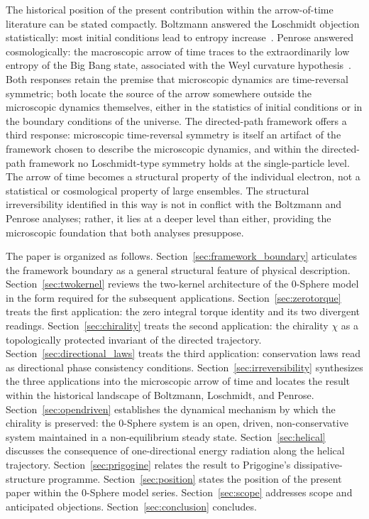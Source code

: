 \documentclass[%
 reprint, amsmath,amssymb, aps, prb, ]{revtex4-2}
\numberwithin{equation}{section}
\begin{document}
The historical position of the present contribution within the arrow-of-time literature can be stated compactly. Boltzmann answered the Loschmidt objection statistically: most initial conditions lead to entropy increase~\cite{Boltzmann1872}. Penrose answered cosmologically: the macroscopic arrow of time traces to the extraordinarily low entropy of the Big Bang state, associated with the Weyl curvature hypothesis~\cite{Penrose1989}. Both responses retain the premise that microscopic dynamics are time-reversal symmetric; both locate the source of the arrow somewhere outside the microscopic dynamics themselves, either in the statistics of initial conditions or in the boundary conditions of the universe. The directed-path framework offers a third response: microscopic time-reversal symmetry is itself an artifact of the framework chosen to describe the microscopic dynamics, and within the directed-path framework no Loschmidt-type symmetry holds at the single-particle level. The arrow of time becomes a structural property of the individual electron, not a statistical or cosmological property of large ensembles. The structural irreversibility identified in this way is not in conflict with the Boltzmann and Penrose analyses; rather, it lies at a deeper level than either, providing the microscopic foundation that both analyses presuppose.

The paper is organized as follows. Section~\ref{sec:framework_boundary} articulates the framework boundary as a general structural feature of physical description. Section~\ref{sec:twokernel} reviews the two-kernel architecture of the 0-Sphere model in the form required for the subsequent applications. Section~\ref{sec:zerotorque} treats the first application: the zero integral torque identity and its two divergent readings. Section~\ref{sec:chirality} treats the second application: the chirality $\chi$ as a topologically protected invariant of the directed trajectory. Section~\ref{sec:directional_laws} treats the third application: conservation laws read as directional phase consistency conditions. Section~\ref{sec:irreversibility} synthesizes the three applications into the microscopic arrow of time and locates the result within the historical landscape of Boltzmann, Loschmidt, and Penrose. Section~\ref{sec:opendriven} establishes the dynamical mechanism by which the chirality is preserved: the 0-Sphere system is an open, driven, non-conservative system maintained in a non-equilibrium steady state. Section~\ref{sec:helical} discusses the consequence of one-directional energy radiation along the helical trajectory. Section~\ref{sec:prigogine} relates the result to Prigogine's dissipative-structure programme. Section~\ref{sec:position} states the position of the present paper within the 0-Sphere model series. Section~\ref{sec:scope} addresses scope and anticipated objections. Section~\ref{sec:conclusion} concludes.
\end{document}
